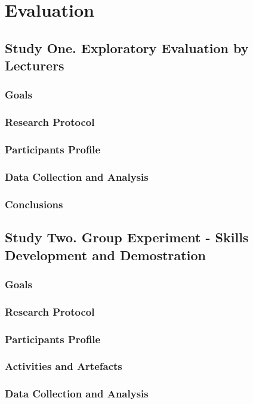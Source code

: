 \chapter{Evaluation\label{cha:evaluation}}

\section{Study One. Exploratory Evaluation by Lecturers}
\subsection{Goals}
\subsection{Research Protocol}
\subsection{Participants Profile}
\subsection{Data Collection and Analysis}
\subsection{Conclusions}
 
\section{Study Two. Group Experiment - \LLLc Skills Development and
Demostration}
\subsection{Goals}
\subsection{Research Protocol}
\subsection{Participants Profile}
\subsection{Activities and Artefacts}
\subsection{Data Collection and Analysis}
